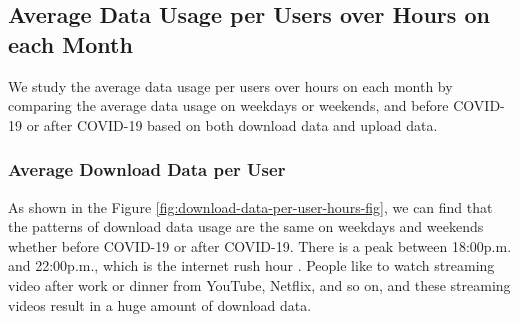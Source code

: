 \subsection{Average Data Usage per Users over Hours on each Month}
We study the average data usage per users over hours on each month by comparing the average data usage on weekdays or weekends, and before COVID-19 or after COVID-19 based on both download data and upload data. 


\subsubsection{Average Download Data per User}
\label{sec:download-data-per-user-over-hours}


As shown in the Figure \ref{fig:download-data-per-user-hours-fig}, we can find that the patterns of download data usage are the same on weekdays and weekends whether before COVID-19 or after COVID-19. There is a peak between 18:00p.m. and 22:00p.m., which is the internet rush hour \cite{internetrushhour}. People like to watch streaming video after work or dinner from YouTube, Netflix, and so on, and these streaming videos result in a huge amount of download data.

